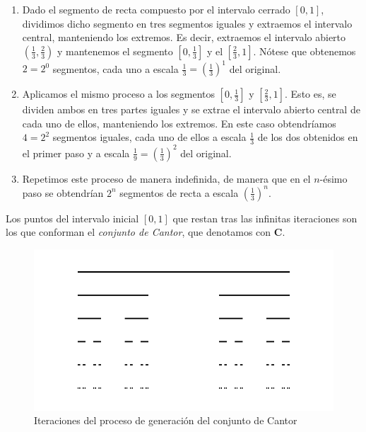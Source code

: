 \begin{enumerate}
\item Dado el segmento de recta compuesto por el intervalo cerrado $[0,1]$, dividimos dicho segmento en tres segmentos iguales y extraemos el intervalo central, manteniendo los extremos. Es decir, extraemos el intervalo abierto $\left(\frac 1 3, \frac 2 3\right)$ y mantenemos el segmento $\left[0,\frac 1 3\right]$ y el $\left[\frac 2 3, 1\right]$. Nótese que obtenemos $2=2^0$ segmentos, cada uno a escala $\frac 1 3=\left(\frac 1 3\right)^1$ del original.

\item Aplicamos el mismo proceso a los segmentos $\left[0,\frac 1 3\right]$ y $\left[\frac 2 3, 1\right]$. Esto es, se dividen ambos en tres partes iguales y se extrae el intervalo abierto central de cada uno de ellos, manteniendo los extremos. En este caso obtendríamos $4=2^2$ segmentos iguales, cada uno de ellos a escala $\frac 1 3$ de los dos obtenidos en el primer paso y a escala $\frac 1 9=\left(\frac 1 3\right)^2$ del original.

\item Repetimos este proceso de manera indefinida, de manera que en el $n$-ésimo paso se obtendrían $2^n$ segmentos de recta a escala $\left(\frac 1 3\right)^n$.
\end{enumerate} 

Los puntos del intervalo inicial $[0,1]$ que restan tras las infinitas iteraciones son los que conforman el \textit{conjunto de Cantor}, que denotamos con $\textbf{C}$.

\begin{figure} [h]
\centering
\includegraphics[scale = 0.5]{img/cantor.png}
\caption{Iteraciones del proceso de generación del conjunto de Cantor}
 \label{fig:Cantor}
\end{figure}


